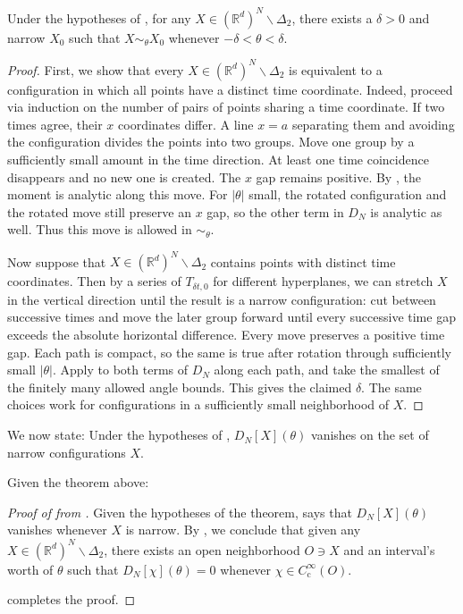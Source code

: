 \documentclass[11pt, letterpaper, reqno]{amsart}
\theoremstyle{definition}
\newenvironment{proposition}
{\pushQED{\qed}\renewcommand{\qedsymbol}{$\blacksquare$}\propositionx}
{\popQED\endpropositionx}
\newenvironment{theorem}
{\pushQED{\qed}\renewcommand{\qedsymbol}{$\blacksquare\square$}\theoremxx}
{\popQED\endtheoremxx}
\theoremstyle{remark}
\newcommand{\bbR}{\mathbb{R}}
\begin{document}
\begin{proposition}\label{prop:narrowing}
    Under the hypotheses of , for any $X\in (\bbR^d)^N\backslash \Delta_2$, there exists a $\delta>0$ and narrow $X_0$ such that $X\sim_\theta X_0$ whenever $-\delta<\theta<\delta$. 
\end{proposition}
\begin{proof}
    First, we show that every $X\in (\bbR^d)^N\backslash \Delta_2$ is equivalent to a configuration in which all points have a distinct time coordinate. Indeed, proceed via induction on the number of pairs of points sharing a time coordinate. If two times agree, their $x$ coordinates differ. A line $x=a$ separating them and avoiding the configuration divides the points into two groups. Move one group by a sufficiently small amount in the time direction. At least one time coincidence disappears and no new one is created. The $x$ gap remains positive. By , the moment is analytic along this move. For $|\theta|$ small, the rotated configuration and the rotated move still preserve an $x$ gap, so the other term in $D_N$ is analytic as well. Thus this move is allowed in $\sim_\theta$.

    Now suppose that $X\in (\bbR^d)^N\backslash \Delta_2$ contains points with distinct time coordinates. Then by a series of $T_{\delta t,0}$ for different hyperplanes, we can stretch $X$ in the vertical direction until the result is a narrow configuration: cut between successive times and move the later group forward until every successive time gap exceeds the absolute horizontal difference. Every move preserves a positive time gap. Each path is compact, so the same is true after rotation through sufficiently small $|\theta|$. Apply  to both terms of $D_N$ along each path, and take the smallest of the finitely many allowed angle bounds. This gives the claimed $\delta$. The same choices work for configurations in a sufficiently small neighborhood of $X$.
\end{proof}

We now state:
\begin{theorem}\label{thm:weaker}
    Under the hypotheses of , $D_N[X](\theta)$ vanishes on the set of narrow configurations $X$.
\end{theorem}

Given the theorem above:
\begin{proof}[Proof of  from ]
    Given the hypotheses of the theorem,  says that $D_N[X](\theta)$ vanishes whenever $X$ is narrow. By , we conclude that given any $X\in (\bbR^d)^N\backslash \Delta_2$, there exists an open neighborhood $O\ni X$ and an interval's worth of $\theta$ such that $D_N[\chi](\theta)=0$ whenever $\chi\in C_{\mathrm{c}}^\infty(O)$. 

     completes the proof.   
\end{proof}
\end{document}
